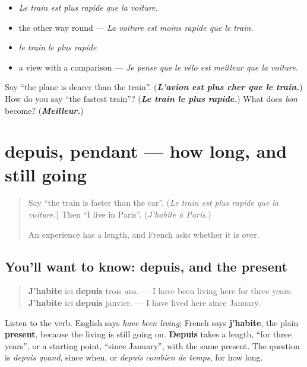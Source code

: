 \begin{itemize}
\raggedright
  \item \emph{Le train est plus rapide que la voiture.}
  \item the other way round — \emph{La voiture est moins rapide que le train.}
  \item \emph{le train le plus rapide}
  \item a view with a comparison — \emph{Je pense que le vélo est meilleur que la voiture.}
\end{itemize}

\begin{tcolorbox}[breakable,colback=teal!4,colframe=teal!35!black,title={Before you move on}]
Say \textquotedblleft{}the plane is dearer than the train\textquotedblright{}. (\emph{\textbf{L'avion est plus cher que le train.}}) How do you say \textquotedblleft{}the fastest train\textquotedblright{}? (\emph{\textbf{Le train le plus rapide.}}) What does \emph{bon} become? (\emph{\textbf{Meilleur.}})
\end{tcolorbox}
\section[depuis, pendant]{depuis, pendant — how long, and still going}

\label{lesson:FR-C265-depuis-pendant}



\begin{quote}
Say \textquotedblleft{}the train is faster than the car\textquotedblright{}. (\emph{Le train est plus rapide que la voiture.}) Then \textquotedblleft{}I live in Paris\textquotedblright{}. (\emph{J'habite à Paris.})

An experience has a length, and French asks whether it is over.
\end{quote}

\subsection*{You'll want to know: depuis, and the present}
\begin{quote}
\textbf{J'habite} ici \textbf{depuis} trois ans. — I have been living here for three years. \textbf{J'habite} ici \textbf{depuis} janvier. — I have lived here since January.
\end{quote}

Listen to the verb. English says \emph{have been living}; French says \textbf{j'habite}, the plain \textbf{present}, because the living is still going on. \textbf{Depuis} takes a length, \textquotedblleft{}for three years\textquotedblright{}, or a starting point, \textquotedblleft{}since January\textquotedblright{}, with the same present. The question is \emph{depuis quand}, since when, or \emph{depuis combien de temps}, for how long.

